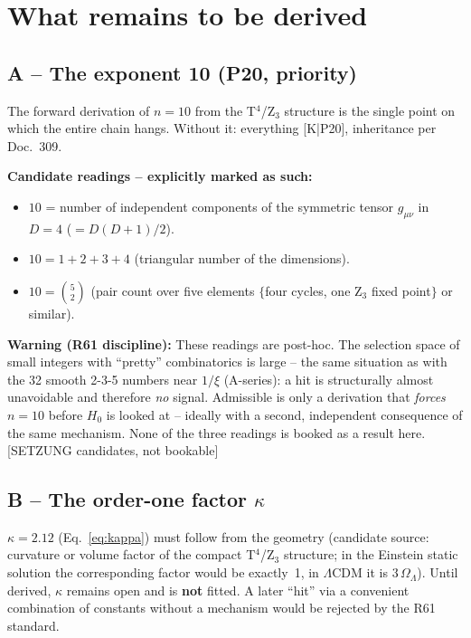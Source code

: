 \documentclass[11pt]{report}
\begin{document}
\chapter{What remains to be derived}
\label{ch:pflichten}

\section{A -- The exponent 10 (P20, priority)}

The forward derivation of $n=10$ from the T$^4$/Z$_3$ structure is
the single point on which the entire chain hangs. Without it:
everything [K|P20], inheritance per Doc.~309.

\textbf{Candidate readings -- explicitly marked as such:}
\begin{itemize}
  \item $10$ = number of independent components of the symmetric
        tensor $g_{\mu\nu}$ in $D=4$ ($= D(D{+}1)/2$).
  \item $10 = 1+2+3+4$ (triangular number of the dimensions).
  \item $10 = \binom{5}{2}$ (pair count over five elements
        $\{$four cycles, one Z$_3$ fixed point$\}$ or similar).
\end{itemize}

\textbf{Warning (R61 discipline):} These readings are post-hoc. The
selection space of small integers with \enquote{pretty}
combinatorics is large -- the same situation as with the 32 smooth
2-3-5 numbers near $1/\xi$ (A-series): a hit is structurally almost
unavoidable and therefore \emph{no} signal. Admissible is only a
derivation that \emph{forces} $n=10$ before $H_0$ is looked at --
ideally with a second, independent consequence of the same
mechanism. None of the three readings is booked as a result here.
[SETZUNG candidates, not bookable]

\section{B -- The order-one factor $\kappa$}

$\kappa = 2.12$ (Eq.~\eqref{eq:kappa}) must follow from the
geometry (candidate source: curvature or volume factor of the
compact T$^4$/Z$_3$ structure; in the Einstein static solution the
corresponding factor would be exactly~1, in $\Lambda$CDM it is
$3\,\Omega_\Lambda$). Until derived, $\kappa$ remains open and is
\textbf{not} fitted. A later \enquote{hit} via a convenient
combination of constants without a mechanism would be rejected by
the R61 standard.
\end{document}
